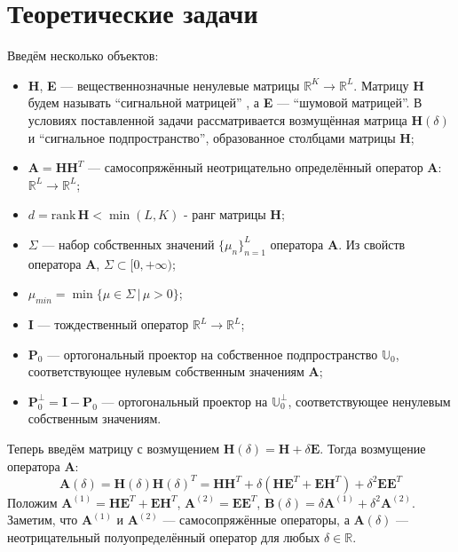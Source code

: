 \documentclass[fleqn]{article}
\newcommand\R{\mathbb{R}}
\newcommand\rank{\textrm{rank}\,}
\begin{document}
 	\section{Теоретические задачи}
		Введём несколько объектов:%
	\begin{itemize}
		\item \textbf{H}, \textbf{E} --- вещественнозначные ненулевые матрицы $\R^K \rightarrow \R^L$. Матрицу \textbf{H} будем называть ``сигнальной матрицей'' , а \textbf{E} --- ``шумовой матрицей''. В условиях поставленной задачи рассматривается возмущённая матрица $\mathbf{H}(\delta)$ и ``сигнальное подпространство'', образованное столбцами матрицы \textbf{H};
		\item  $\mathbf{A} = \mathbf{HH}^T$ --- самосопряжённый неотрицательно определённый оператор \textbf{A}: $\R^L \rightarrow \R^L$;
		\item $d = \rank\mathbf{H} < \min(L, K)$ - ранг матрицы \textbf{H};
		\item $\Sigma$ --- набор собственных значений $\{\mu_n\}_{n=1}^L$ оператора \textbf{A}. Из свойств оператора \textbf{A}, $\Sigma \subset [0, +\infty)$;
		\item $\mu_{min} = \min\{\mu\in\Sigma\, |\, \mu > 0\}$;
		\item $\mathbf{I}$ --- тождественный оператор $\R^L \rightarrow \R^L$;
		\item $\mathbf{P}_0$ --- ортогональный проектор на собственное подпространство $\mathbb{U}_0$, соответствующее нулевым собственным значениям \textbf{A};
		\item $\mathbf{P}^\bot_0 = \mathbf{I} - \mathbf{P}_0$ --- ортогональный проектор на $\mathbb{U}_0^\bot$, соответствующее ненулевым собственным значениям.
	\end{itemize}
	Теперь введём матрицу с возмущением $\mathbf{H}(\delta) = \mathbf{H} + \delta\mathbf{E}$. Тогда возмущение оператора $\mathbf{A}$:
	\begin{equation*}
		\mathbf{A}(\delta) = \mathbf{H}(\delta)\mathbf{H}(\delta)^T = \mathbf{H}\mathbf{H}^T + \delta(\mathbf{H}\mathbf{E}^T + \mathbf{E}\mathbf{H}^T) + \delta^2\mathbf{E}\mathbf{E}^T
	\end{equation*}
	Положим $\mathbf{A}^{(1)} = \mathbf{H}\mathbf{E}^T + \mathbf{E}\mathbf{H}^T$, $\mathbf{A}^{(2)} = \mathbf{E}\mathbf{E}^T$, $\mathbf{B}(\delta) = \delta\mathbf{A}^{(1)} + \delta^2\mathbf{A}^{(2)}$. Заметим, что $\mathbf{A}^{(1)}$ и $\mathbf{A}^{(2)}$ --- самосопряжённые операторы, а $\mathbf{A}(\delta)$ --- неотрицательный полуопределённый оператор для любых $\delta\in\R$.\\
\end{document}
